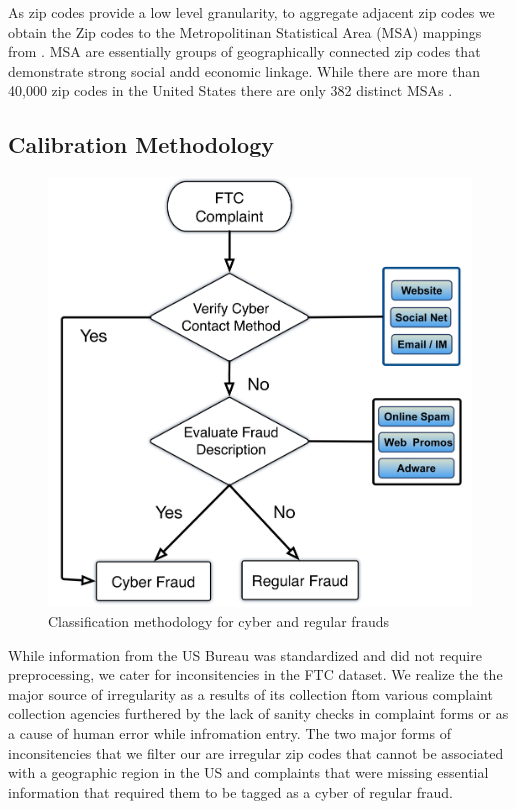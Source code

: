 \documentclass[conference]{IEEEtran}
\begin{document}
As zip codes provide a low level granularity, to aggregate adjacent zip codes we obtain the Zip codes to the Metropolitinan Statistical Area (MSA) mappings from \cite{deptlabor}. MSA are essentially groups of geographically connected zip codes that demonstrate strong social andd economic linkage. While there are more than 40,000 zip codes in the United States there are only 382 distinct MSAs \cite{usbureau}.

\subsection{Calibration Methodology}

\begin{figure}
\centering
  \includegraphics[scale=0.5]{graphics/methodology.png}
  \caption{Classification methodology for cyber and regular frauds}
  \label{classify}
\end{figure}

While information from the US Bureau was standardized and did not require preprocessing, we cater for inconsitencies in the FTC dataset. We realize the the major source of irregularity as a results of its collection ftom various complaint collection agencies furthered by the lack of sanity checks in complaint forms or as a cause of human error while infromation entry. The two major forms of inconsitencies that we filter our are irregular zip codes that cannot be associated with a geographic region in the US and complaints that were missing essential information that required them to be tagged as a cyber of regular fraud.
\end{document}
